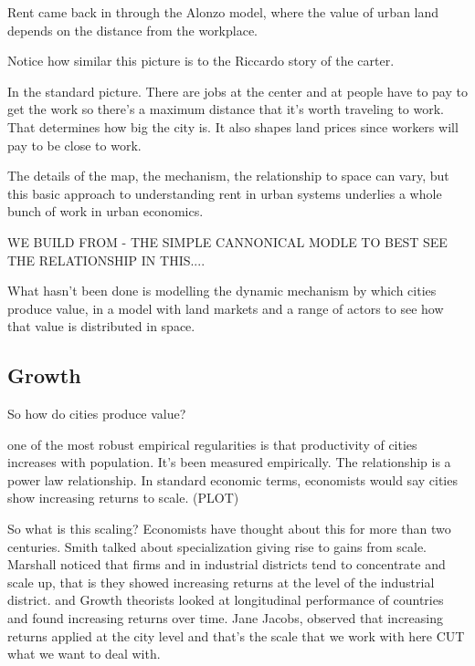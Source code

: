 \documentclass[]{article}
\begin{document}
Rent came back in through the Alonzo model, where the value of urban land depends on the distance from the workplace. 

Notice how similar this picture is to the Riccardo story of the carter.

In  the standard picture. There are jobs at the center and at people have to pay to get the work so  there's a maximum distance that it's worth traveling to work. That determines how big the city is. It also shapes land prices since workers will pay to be close to work.

The details of the map, the mechanism, the relationship to space can vary, but this basic approach to understanding rent in urban systems underlies a whole bunch of work in urban economics.

WE BUILD FROM - THE SIMPLE CANNONICAL MODLE TO BEST SEE THE RELATIONSHIP IN THIS....

What hasn't been done is modelling the dynamic mechanism by which cities produce value, in a model with land markets and a range of actors to see how that value is distributed in space. 



\subsection{Growth}
So how do cities produce value?



one of the most robust empirical regularities is that 
productivity of cities increases with population. It's been measured empirically. The relationship is a power law relationship. In  standard economic terms, economists would say cities show increasing returns to scale. (PLOT)

So what is this  scaling?
Economists have thought about this for more than two centuries. Smith talked about specialization giving rise to gains from scale. 
Marshall noticed that firms and in industrial districts tend to concentrate and scale up, that is they showed increasing returns at the level of the industrial district. 
and Growth theorists looked at longitudinal performance of countries and found increasing returns over time.
Jane Jacobs, observed that increasing returns applied at the city level and that's the scale that we work with here CUT what we want to deal with.
\end{document}
